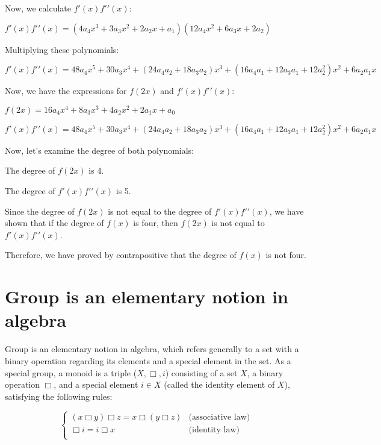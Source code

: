 \documentclass{article}
\begin{document}
Now, we calculate \(f \prime(x)f\prime \prime(x)\):

$f\prime(x)f\prime \prime(x) = (4a_4x^3 + 3a_3x^2 + 2a_2x + a_1)(12a_4x^2 + 6a_3x + 2a_2)$

Multiplying these polynomials:

$f\prime(x)f\prime \prime(x) = 48a_4x^5 + 30a_3x^4 + (24a_4a_2 + 18a_3a_2)x^3 + (16a_4a_1 + 12a_3a_1 + 12a_2^2)x^2 + 6a_2a_1x$

Now, we have the expressions for $f(2x)$ and $f\prime(x)f\prime \prime(x)$:

$f(2x) = 16a_4x^4 + 8a_3x^3 + 4a_2x^2 + 2a_1x + a_0$

$f\prime(x)f\prime \prime(x) = 48a_4x^5 + 30a_3x^4 + (24a_4a_2 + 18a_3a_2)x^3 + (16a_4a_1 + 12a_3a_1 + 12a_2^2)x^2 + 6a_2a_1x$

Now, let's examine the degree of both polynomials:

The degree of $f(2x)$ is 4.

The degree of $f\prime(x)f\prime \prime(x)$ is 5.

Since the degree of $f(2x)$ is not equal to the degree of $f\prime(x)f\prime \prime(x)$, we have shown that if the degree of $f(x)$ is four, then $f(2x)$ is not equal to $f\prime(x)f\prime \prime(x)$.

Therefore, we have proved by contrapositive that the degree of $f(x)$ is not four.

\section{Group is an elementary notion in algebra}

Group is an elementary notion in algebra, which refers generally to a set with a binary operation regarding its elements and a special element in the set. As a special group, a monoid is a triple ($X, \Box , i$) consisting of a set $X$, a binary operation $\Box$, and a special element $i \in X$ (called the identity element of $X$), satisfying the following rules:

\begin{equation*}
  \left\{
    \begin{array}{ll}
      (x \Box y)\Box z = x \Box(y \Box z) &\text{(associative law)} \\
      \Box i = i \Box x &\text{(identity law)}\\
    \end{array} 
  \right.
\end{equation*}
\end{document}
